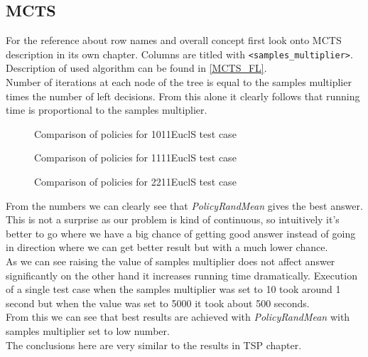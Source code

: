 \FloatBarrier


\FloatBarrier

\begin{figure}[ht]
  
\end{figure}

\subsection{MCTS}

For the reference about row names and overall concept first look onto MCTS description in its own chapter.
Columns are titled with \verb+<samples_multiplier>+. \\
Description of used algorithm can be found in \ref{MCTS_FL}. \\
Number of iterations at each node of the tree is equal to the samples multiplier times the number of left decisions.
From this alone it clearly follows that running time is proportional to the samples multiplier.

\FloatBarrier
\begin{figure}[ht]
  
  \caption{Comparison of policies for 1011EuclS test case}
\end{figure}

\begin{figure}[ht]
  
  \caption{Comparison of policies for 1111EuclS test case}
\end{figure}

\begin{figure}[ht]
  
  \caption{Comparison of policies for 2211EuclS test case}
\end{figure}
\FloatBarrier

From the numbers we can clearly see that \emph{PolicyRandMean} gives the best answer.
This is not a surprise as our problem is kind of continuous, so intuitively it's better
to go where we have a big chance of getting good answer instead of going in direction
where we can get better result but with a much lower chance. \\
As we can see raising the value of samples multiplier does not affect answer significantly on the other hand
it increases running time dramatically. Execution of a single test case when the samples multiplier
was set to 10 took around 1 second but when the value was set to 5000 it took about 500 seconds. \\
From this we can see that best results are achieved with \emph{PolicyRandMean} with samples multiplier set to low number. \\
The conclusions here are very similar to the results in TSP chapter. 
